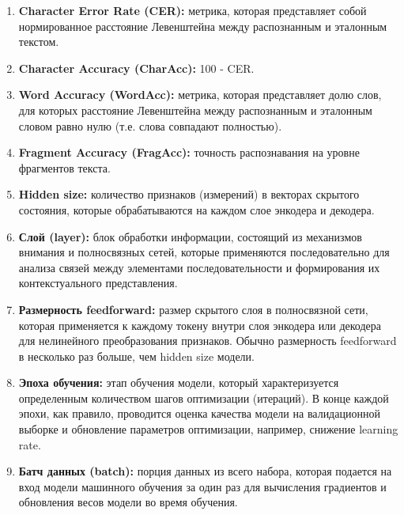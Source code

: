 \begin{enumerate}
    \item  \textbf{Character Error Rate (CER):}  метрика, которая представляет  собой  нормированное  расстояние  Левенштейна между  распознанным  и  эталонным  текстом. 

    \item  \textbf{Character Accuracy (CharAcc):}  100 - CER.
    
    \item  \textbf{Word Accuracy (WordAcc):}  метрика, которая представляет долю  слов,  для  которых  расстояние  Левенштейна  между  распознанным  и  эталонным  словом  равно  нулю  (т.е.  слова  совпадают  полностью).

    \item  \textbf{Fragment Accuracy (FragAcc):}  точность распознавания на уровне фрагментов текста.

    \item  \textbf{Hidden size:} количество признаков (измерений) в векторах скрытого состояния, которые обрабатываются на каждом слое энкодера и декодера. 

    \item  \textbf{Слой (layer):} блок обработки информации, состоящий из механизмов внимания и полносвязных сетей, которые применяются последовательно для анализа связей между элементами последовательности и формирования их контекстуального представления. 

    \item  \textbf{Размерность feedforward:} размер скрытого слоя в полносвязной сети, которая применяется к каждому токену внутри слоя энкодера или декодера для нелинейного преобразования признаков. Обычно размерность feedforward в несколько раз больше, чем hidden size модели. 

    \item  \textbf{Эпоха обучения:}  этап  обучения модели, который  характеризуется определенным количеством  шагов оптимизации (итераций). В конце каждой эпохи, как правило, проводится оценка качества модели на валидационной выборке и обновление параметров оптимизации,  например,  снижение  learning rate.

    \item  \textbf{ Батч данных (batch):} порция данных из всего набора, которая подается на вход модели машинного обучения за один раз для вычисления градиентов и обновления весов модели во время обучения. 


\end{enumerate}
